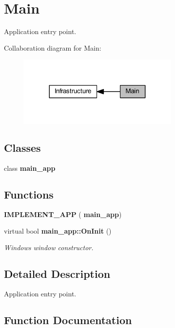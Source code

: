 \section{Main}
\label{group___main}


Application entry point.  


Collaboration diagram for Main\+:
\nopagebreak
\begin{figure}[H]
\begin{center}
\leavevmode
\includegraphics[width=227pt]{group___main}
\end{center}
\end{figure}
\subsection*{Classes}
\begin{DoxyCompactItemize}
\item 
class \textbf{ main\+\_\+app}
\end{DoxyCompactItemize}
\subsection*{Functions}
\begin{DoxyCompactItemize}
\item 
\textbf{ I\+M\+P\+L\+E\+M\+E\+N\+T\+\_\+\+A\+PP} (\textbf{ main\+\_\+app})
\item 
virtual bool \textbf{ main\+\_\+app\+::\+On\+Init} ()
\begin{DoxyCompactList}\small\item\em Windows window constructor. \end{DoxyCompactList}\end{DoxyCompactItemize}


\subsection{Detailed Description}
Application entry point. 



\subsection{Function Documentation}
\mbox{\label{group___main_gaebfea8791071ccc2c05f0891cde86213}} 
